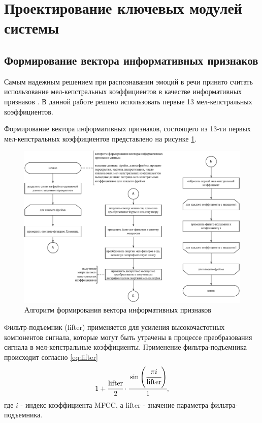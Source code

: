 \section{Проектирование ключевых модулей системы}
\subsection{Формирование вектора информативных признаков}
Самым надежным решением при распознавании эмоций в речи принято считать использование мел-кепстральных коэффициентов в качестве информативных признаков \cite{review}. В данной работе решено использовать первые 13 мел-кепстральных коэффициентов.

Формирование вектора информативных признаков, состоящего из 13-ти первых мел-кепстральных коэффициентов представлено на рисунке \ref{fig:mfcc-vector}.
\begin{figure}[H]
	\centering
	\includegraphics[width=\linewidth]{assets/mfccs-flowchart}
	\caption{Алгоритм формирования вектора информативных признаков}
	\label{fig:mfcc-vector}
\end{figure}

Фильтр-подъемник (lifter) применяется для усиления высокочастотных компонентов сигнала, которые могут быть утрачены в процессе преобразования сигнала в мел-кепстральные коэффициенты. Применение фильтра-подъемника происходит согласно \ref{eq:lifter}
\begin{equation}\label{eq:lifter}
	1 + \cfrac{\mathrm{lifter}}{2} \cdot \cfrac{\sin\left(\cfrac{\pi i}{\mathrm{lifter}}\right)}{1},
\end{equation}
где $i$ - индекс коэффициента MFCC, а $\mathrm{lifter}$ - значение параметра фильтра-подъемника.
